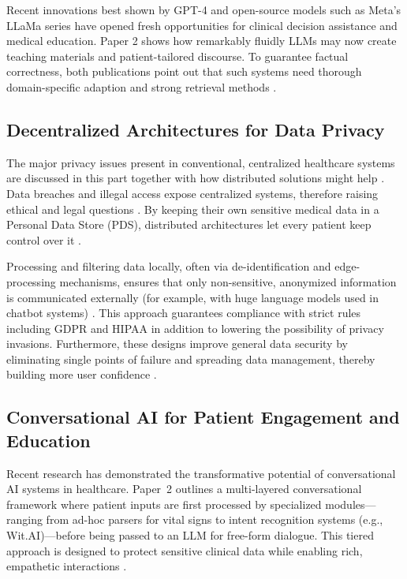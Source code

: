 Recent innovations best shown by GPT-4 \cite{gpt4tech} and open-source models such as Meta's LLaMa series \cite{llama2023} have opened fresh opportunities for clinical decision assistance and medical education. Paper 2 \cite{wen2023b} shows how remarkably fluidly LLMs may now create teaching materials and patient-tailored discourse. To guarantee factual correctness, both publications point out that such systems need thorough domain-specific adaption and strong retrieval methods \cite{montagna2023, wen2023b}.

\subsection{Decentralized Architectures for Data Privacy}
The major privacy issues present in conventional, centralized healthcare systems are discussed in this part together with how distributed solutions might help \cite{zichichi2022}. Data breaches and illegal access expose centralized systems, therefore raising ethical and legal questions \cite{eu2016, hipaa1996}. By keeping their own sensitive medical data in a Personal Data Store (PDS), distributed architectures let every patient keep control over it \cite{zichichi2020a}. 

Processing and filtering data locally, often via de-identification and edge-processing mechanisms, ensures that only non-sensitive, anonymized information is communicated externally (for example, with huge language models used in chatbot systems) \cite{zichichi2020b}. This approach guarantees compliance with strict rules including GDPR \cite{eu2016} and HIPAA \cite{hipaa1996} in addition to lowering the possibility of privacy invasions. Furthermore, these designs improve general data security by eliminating single points of failure and spreading data management, thereby building more user confidence \cite{zichichi2022}.

\subsection{Conversational AI for Patient Engagement and Education}
Recent research has demonstrated the transformative potential of conversational AI systems in healthcare. Paper~2 \cite{wen2023b} outlines a multi-layered conversational framework where patient inputs are first processed by specialized modules—ranging from ad-hoc parsers for vital signs to intent recognition systems (e.g., Wit.AI)—before being passed to an LLM for free-form dialogue. This tiered approach is designed to protect sensitive clinical data while enabling rich, empathetic interactions \cite{montagna2023, wen2023b}.

